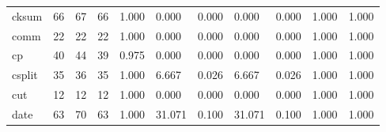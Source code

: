 \begin{longtable}{lp{1.2cm}p{1.2cm}p{1.2cm}p{1.2cm}p{1.2cm}p{1.2cm}p{1.2cm}p{1.2cm}p{1.2cm}p{1.2cm}}
cksum     &                           66 &                 67 &                                66 &                                      1.000 &                                  0.000 &                                        0.000 &                             0.000 &                                   0.000 &                              1.000 &                                              1.000 \\
comm      &                           22 &                 22 &                                22 &                                      1.000 &                                  0.000 &                                        0.000 &                             0.000 &                                   0.000 &                              1.000 &                                              1.000 \\
cp        &                           40 &                 44 &                                39 &                                      0.975 &                                  0.000 &                                        0.000 &                             0.000 &                                   0.000 &                              1.000 &                                              1.000 \\
csplit    &                           35 &                 36 &                                35 &                                      1.000 &                                  6.667 &                                        0.026 &                             6.667 &                                   0.026 &                              1.000 &                                              1.000 \\
cut       &                           12 &                 12 &                                12 &                                      1.000 &                                  0.000 &                                        0.000 &                             0.000 &                                   0.000 &                              1.000 &                                              1.000 \\
date      &                           63 &                 70 &                                63 &                                      1.000 &                                 31.071 &                                        0.100 &                            31.071 &                                   0.100 &                              1.000 &                                              1.000 \\

\end{longtable}
